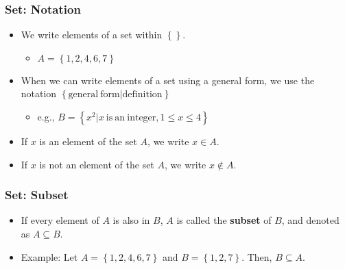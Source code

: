 \documentclass[pdflatex, 12pt]{beamer}
\begin{document}
\begin{frame}
\frametitle{Set: Notation}
\begin{itemize}
\item We write elements of a set within $\left\{\right\}$.
 \begin{itemize}
 \item $A = \left\{1, 2, 4, 6, 7\right\}$
 \end{itemize}
\vspace{0.4cm}
\item When we can write elements of a set using a general form, we use the notation $\left\{\mathrm{general \ form}|\mathrm{definition}\right\}$
 \begin{itemize}
 \item e.g., $B = \left\{x^2|x \ \mathrm{is \ an \ integer}, 1 \le x \le 4\right\}$
 \end{itemize}
\vspace{0.4cm}
\item If $x$ is an element of the set $A$, we write $x \in A$.
\vspace{0.4cm}
\item If $x$ is not an element of the set $A$, we write $x \notin A$.
\end{itemize}
\end{frame}

\begin{frame}
\frametitle{Set: Subset}
\begin{itemize}
\item If every element of $A$ is also in $B$, $A$ is called the \textbf{subset} of $B$, and denoted as $A \subseteq B$.
\vspace{0.4cm}
\item Example: Let $A = \left\{1, 2, 4, 6, 7\right\}$ and $B = \left\{1, 2, 7\right\}$. Then, $B \subseteq A$.
\end{itemize}
\end{frame}
\end{document}
